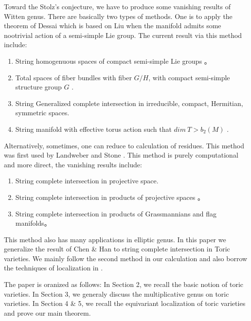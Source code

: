\documentclass[11pt]{article}
\begin{document}
Toward the Stolz's conjecture, we have to produce some vanishing results of Witten genus. There are basically two types of methods. One is to apply the theorem of Dessai \cite{dessai1994witten} which is based on Liu \cite{liu1995modular} when the manifold admits some nootrivial action of a semi-simple Lie group. The current result via this method include:
\begin{enumerate}
\item String homogenuous spaces of compact semi-simple Lie groups \cite{dessai1994witten,liu1995modular}。
\item Total spaces of fiber bundles with fiber $G/H$, with compact semi-simple structure group $G$ \cite{stolz1996conjecture}.
\item String Generalized complete intersection in irreducible, compact, Hermitian, symmetric spaces\cite{forster2007stolz}.
\item String manifold with effective torus action such that $dim\  T>b_2(M)$ \cite{wiemeler2017note}.
\end{enumerate}

Alternatively, sometimes, one can reduce to calculation of residues. This method was first used by Landweber and Stone \cite{hirzebruch1992manifolds}. This method is purely computational and more direct, the vanishing results include:
\begin{enumerate}
\item String complete intersection in projective space\cite{hirzebruch1992manifolds}.
\item String complete intersection in products of projective spaces \cite{chen2008witten}。
\item String complete intersection in products of Grassmannians and flag manifolds\cite{zhou2014witten,zhuang2016vanishing}。
\end{enumerate}
This method also has many applications in elliptic genus\cite{ma2005elliptic,gorbounov2008mirror}.
In this paper we generalize the result of Chen \& Han \cite{chen2008witten} to string complete intersection in Toric varieties. We mainly follow the second method in our calculation and also borrow the techniques of localization in \cite{dessai2016torus}.

The paper is oranized as follows: In Section 2, we recall the basic notion of toric varieties. In Section 3, we generaly discuss the multiplicative genus on toric varieties. In Section 4 \& 5, we recall the equivariant localization of toric varieties and prove our main theorem.
\end{document}
